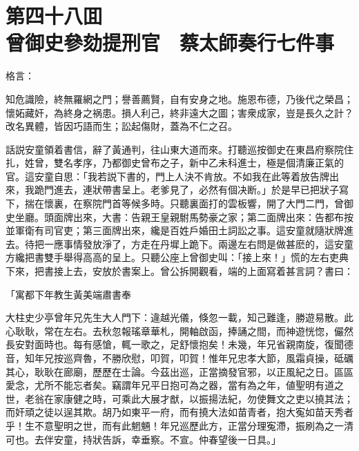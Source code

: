 
\chapter*{第四十八囬　\\曾御史參劾提刑官　蔡太師奏行七件事}


格言：

\begin{myquote}
知危識險，終無羅網之門；譽善薦賢，自有安身之地。施恩布德，乃後代之榮昌；懷妬藏奸，為終身之祸患。損人利己，終非遠大之圖；害衆成家，豈是長久之計？改名異體，皆因巧語而生；訟起傷財，蓋為不仁之召。
\end{myquote}

話説安童領着書信，辭了黃通判，往山東大道而來。打聽巡按御史在東昌府察院住扎，姓曾，雙名孝序，乃都御史曾布之子，新中乙未科進士，極是個清廉正氣的官。這安童自思：「我若説下書的，門上人決不肯放。不如我在此等着放告牌出來，我跪門進去，連狀帶書呈上。老爹見了，必然有個决断。」於是早已把狀子寫下，揣在懷裏，在察院門首等候多時。只聽裏面打的雲板響，開了大門二門，曾御史坐廳。頭面牌出來，大書：告親王皇親駙馬勢豪之家；第二面牌出來：告都布按並軍衛有司官吏；第三面牌出來，纔是百姓戶婚田土詞訟之事。這安童就隨狀牌進去。待把一應事情發放淨了，方走在丹墀上跪下。兩邊左右問是做甚麽的，這安童方纔把書雙手舉得高高的呈上。只聽公座上曾御史叫：「接上來！」慌的左右吏典下來，把書接上去，安放於書案上。曾公拆開觀看，端的上面寫着甚言詞？書曰：

\begin{myquote}[\markfont]
\hspace*{2em}「寓都下年教生黃美端肅書奉

大柱史少亭曾年兄先生大人門下：違越光儀，倏忽一載，知己難逢，勝遊易散。此心耿耿，常在左右。去秋忽報瑤章華札，開軸啟函，捧誦之間，而神遊恍惚，儼然長安對面時也。每有感愴，輒一歌之，足舒懷抱矣！未幾，年兄省親南旋，復聞德音，知年兄按巡齊魯，不勝欣慰，叩賀，叩賀！惟年兄忠孝大節，風霜貞操，砥礪其心，耿耿在廊廟，歷歷在士論。今茲出巡，正當摘發官邪，以正風紀之日。區區愛念，尤所不能忘者矣。竊謂年兄平日抱可為之器，當有為之年，値聖明有道之世，老翁在家康健之時，可乘此大展才猷，以振揚法紀，勿使舞文之吏以撓其法；而奸頑之徒以逞其欺。胡乃如東平一府，而有撓大法如苗青者，抱大寃如苗天秀者乎！生不意聖明之世，而有此魍魎！年兄巡歷此方，正當分理寃滯，振刷為之一清可也。去伴安童，持狀告訴，幸垂察。不宣。仲春望後一日具。」
\end{myquote}

